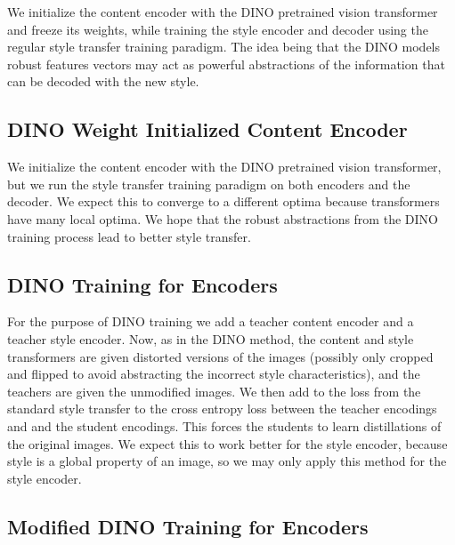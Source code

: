\documentclass{article}
\begin{document}
We initialize the content encoder with the DINO pretrained vision transformer and freeze its weights, while training the style encoder and decoder using the regular style transfer training paradigm. The idea being that the DINO models robust features vectors may act as powerful abstractions of the information that can be decoded with the new style.

\subsection{DINO Weight Initialized Content Encoder}

We initialize the content encoder with the DINO pretrained vision transformer, but we run the style transfer training paradigm on both encoders and the decoder. We expect this to converge to a different optima because transformers have many local optima. We hope that the robust abstractions from the DINO training process lead to better style transfer.

\subsection{DINO Training for Encoders}

For the purpose of DINO training we add a teacher content encoder and a teacher style encoder. Now, as in the DINO method, the content and style transformers are given distorted versions of the images (possibly only cropped and flipped to avoid abstracting the incorrect style characteristics), and the teachers are given the unmodified images. We then add to the loss from the standard style transfer to the cross entropy loss between the teacher encodings and and the student encodings. This forces the students to learn distillations of the original images. We expect this to work better for the style encoder, because style is a global property of an image, so we may only apply this method for the style encoder.

\subsection{Modified DINO Training for Encoders}




\medskip

\nocite{*}


\end{document}

